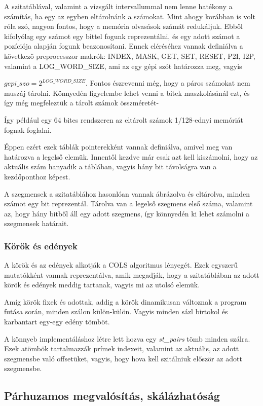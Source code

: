 \documentclass[twoside, a4paper, 12pt]{article}
\begin{document}
A szitatáblával, valamint a vizsgált intervallummal nem lenne hatékony a számítás, ha egy az egyben eltárolnánk a számokat. Mint ahogy korábban is volt róla szó, nagyon fontos, hogy a memória olvasások számát redukáljuk. Ebből kifolyólag egy számot egy bittel fogunk reprezentálni, és egy adott számot a pozíciója alapján fogunk beazonosítani. Ennek eléréséhez vannak definiálva a következő preprocesszor makrók: INDEX, MASK, GET, SET, RESET, P2I, I2P, valamint a LOG\_WORD\_SIZE, ami az egy gépi szót határozza meg, vagyis \par
\( gepi\_szo = 2^{LOG\_WORD\_SIZE} \). Fontos észrevenni még, hogy a páros számokat nem muszáj tárolni. Könnyedén figyelembe lehet venni a bitek maszkolásánál ezt, és így még megfeleztük a tárolt számok összméretét- \par \cite{orig}
Így például egy 64 bites rendszeren az eltárolt számok 1/128-ednyi memóriát fognak foglalni. \par
Éppen ezért ezek táblák pointerekként vannak definiálva, amivel meg van határozva a legelső elemük. Innentől kezdve már csak azt kell kiszámolni, hogy az aktuális szám hanyadik a táblában, vagyis hány bit távolságra van a kezdőponthoz képest. \par
\bigskip
A szegmensek a szitatáblához hasonlóan vannak ábrázolva és eltárolva, minden számot egy bit reprezentál. Tárolva van a legelső szegmens első száma, valamint az, hogy hány bitből áll egy adott szegmens, így könnyedén ki lehet számolni a szegmensek határait.

\subsubsection{Körök és edények}

A körök és az edények alkotják a COLS algoritmus lényegét. Ezek egyszerű mutatókként vannak reprezentálva, amik megadják, hogy a szitatáblában az adott körök és edények meddig tartanak, vagyis mi az utolsó elemük. \par
Amíg körök fixek és adottak, addig a körök dinamikusan változnak a program futása során, minden szálon külön-külön. Vagyis minden sázl birtokol és karbantart egy-egy edény tömböt. \par
A könnyeb implementáláshoz létre lett hozva egy \textit{st\_pairs} tömb minden szálra. Ezek atömbök tartalmazzák prímek indexeit, valamint az aktuális, az adott szegmensbe való offsetüket, vagyis, hogy hova kell szitálniuk először az adott szegmensbe. 

\subsection{Párhuzamos megvalósítás, skálázhatóság} \label{scale} \cite{paral}
\end{document}
